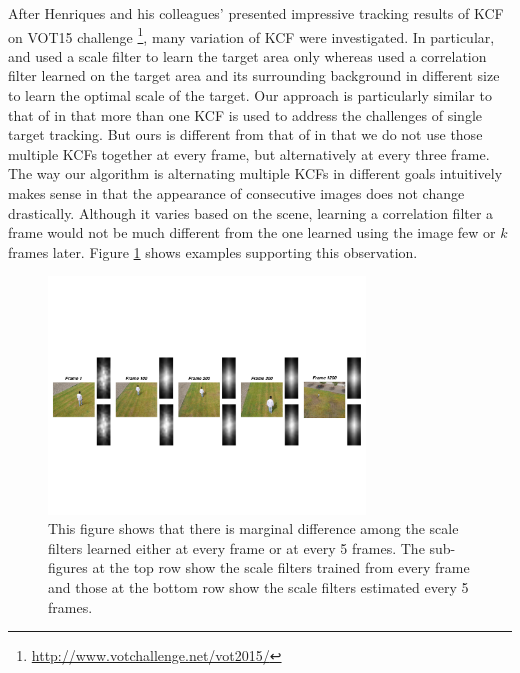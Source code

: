 \documentclass{bmvc2k}
\begin{document}
After Henriques and his colleagues' presented impressive tracking
results of KCF \cite{henriques2015high} on VOT15
challenge \footnote{\url{http://www.votchallenge.net/vot2015/}}, many
variation of KCF were investigated. In particular, \cite{ma2015long}
and \cite{danelljan2014accurate} used a scale filter to learn the
target area only whereas \cite{li2014scale, bibi2015multi,
  tang2015multi} used a correlation filter learned on the target area
and its surrounding background in different size to learn the optimal
scale of the target. Our approach is particularly similar to that of
\cite{ma2015long} in that more than one KCF is used to address the
challenges of single target tracking. But ours is different from that
of \cite{ma2015long} in that we do not use those multiple KCFs
together at every frame, but alternatively at every three frame. The
way our algorithm is alternating multiple KCFs in different goals
intuitively makes sense in that the appearance of consecutive images
does not change drastically. Although it varies based on the scene,
learning a correlation filter a frame would not be much different from
the one learned using the image few or $k$ frames later. Figure
\ref{fig:Filters_Comparison} shows examples supporting this
observation.
\begin{figure}[!h]
\centering
\includegraphics[width=0.75\textwidth]{figures/LearnedFilterComparison.pdf}
\caption{This figure shows that there is marginal difference among the
  scale filters learned either at every frame or at every 5
  frames. The sub-figures at the top row show the scale filters
  trained from every frame and those at the bottom row show the scale
  filters estimated every 5 frames.}
\label{fig:Filters_Comparison}
\end{figure}
\end{document}

